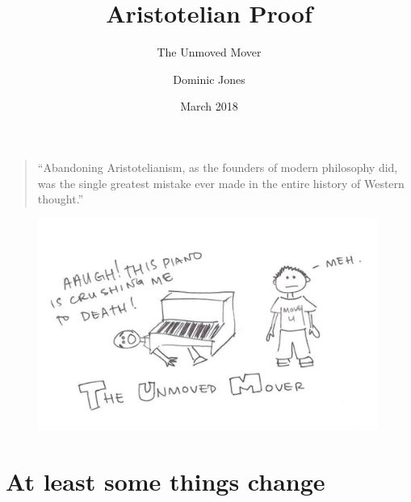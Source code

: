 \documentclass[xcolor=dvipsnames]{beamer}
\title{Aristotelian Proof}
\subtitle{The Unmoved Mover}
\author{Dominic Jones}
\date{March 2018}
\begin{document}
\begin{frame}[plain]
  \titlepage
\end{frame}

\begin{frame}{}
  \begin{quote}
    ``Abandoning Aristotelianism, as the founders of modern philosophy did, was the single greatest mistake ever made in the entire history of Western thought.''
  \end{quote}
      \hspace*{10cm}{E.F.}
\end{frame}

\begin{frame}{}
\begin{figure}
  \centering
  \includegraphics[width=0.99\textwidth]{unmoved_mover}
\end{figure}
\end{frame}

\section{At least some things change}
\end{document}
